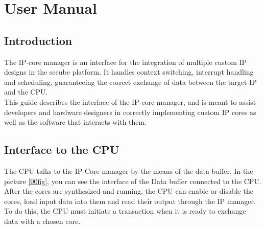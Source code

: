 \chapter{User Manual}\label{usecase}

\section{Introduction}
The IP-core manager is an interface for the integration of multiple custom IP designs in the secube platform. It handles context switching, interrupt handling and scheduling, guaranteeing the correct exchange of data between the target IP and the CPU.
\vspace{0.5cm}\\
This guide describes the interface of the IP core manager, and is meant to assist developers and hardware designers in correctly implementing custom IP cores as well as the software that interacts with them.




\section{Interface to the CPU}

The CPU talks to the IP-Core manager by the means of the data buffer. In the picture \ref{00fig}, you can see the interface of the Data buffer connected to the CPU.\\


After the cores are synthesized and running, the CPU can enable or disable the cores, load input data into them and read their output through the IP manager.
\vspace{0.5cm}\\
To do this, the CPU must initiate a transaction when it is ready to exchange data with a chosen core. 


